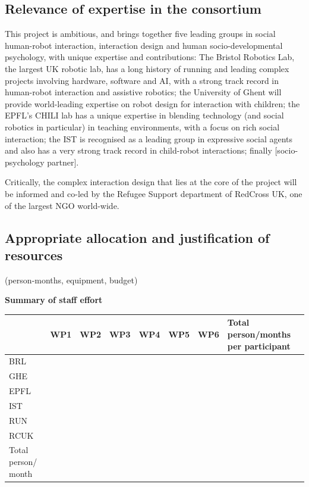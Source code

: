 \documentclass[]{article}
\begin{document}
\hypertarget{relevance-of-expertise-in-the-consortium}{%
\subsection{Relevance of expertise in the
consortium}\label{relevance-of-expertise-in-the-consortium}}

This project is ambitious, and brings together five leading groups in
social human-robot interaction, interaction design and human
socio-developmental psychology, with unique expertise and contributions:
The Bristol Robotics Lab, the largest UK robotic lab, has a long history
of running and leading complex projects involving hardware, software and
AI, with a strong track record in human-robot interaction and assistive
robotics; the University of Ghent will provide world-leading expertise
on robot design for interaction with children; the EPFL's CHILI lab has
a unique expertise in blending technology (and social robotics in
particular) in teaching environments, with a focus on rich social
interaction; the IST is recognised as a leading group in expressive
social agents and also has a very strong track record in child-robot
interactions; finally {[}socio-psychology partner{]}.

Critically, the complex interaction design that lies at the core of the
project will be informed and co-led by the Refugee Support department of
RedCross UK, one of the largest NGO world-wide.

\hypertarget{appropriate-allocation-and-justification-of-resources}{%
\subsection{Appropriate allocation and justification of
resources}\label{appropriate-allocation-and-justification-of-resources}}

(person-months, equipment, budget)

\textbf{Summary of staff effort}

\begin{longtable}[]{@{}llllllll@{}}
\toprule
& WP1 & WP2 & WP3 & WP4 & WP5 & WP6 & Total person/months per
participant\tabularnewline
\midrule
\endhead
BRL & & & & & & &\tabularnewline
GHE & & & & & & &\tabularnewline
EPFL & & & & & & &\tabularnewline
IST & & & & & & &\tabularnewline
RUN & & & & & & &\tabularnewline
RCUK & & & & & & &\tabularnewline
Total person/ month & & & & & & &\tabularnewline
\bottomrule
\end{longtable}
\end{document}
